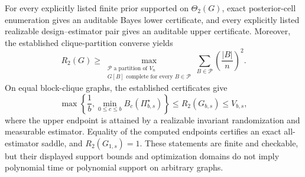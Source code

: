 For every explicitly listed finite prior supported on \(\Theta_2(G)\), exact posterior-cell enumeration gives an auditable Bayes lower certificate, and every explicitly listed realizable design--estimator pair gives an auditable upper certificate. Moreover, the established clique-partition converse yields \[R_2(G)\ge \max_{\substack{\mathcal P\text{ a partition of }V_n\\G[B]\text{ complete for every }B\in\mathcal P}}\sum_{B\in\mathcal P}\left(\frac{|B|}{n}\right)^2.\] On equal block-clique graphs, the established certificates give \[\max\left\{\frac1b,\min_{0\le c\le b}B_c(\Pi_{b,s}^{\star})\right\}\le R_2(G_{b,s})\le V_{b,s},\] where the upper endpoint is attained by a realizable invariant randomization and measurable estimator. Equality of the computed endpoints certifies an exact all-estimator saddle, and \(R_2(G_{1,s})=1\). These statements are finite and checkable, but their displayed support bounds and optimization domains do not imply polynomial time or polynomial support on arbitrary graphs.